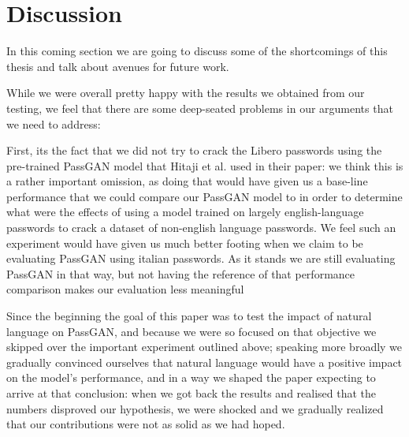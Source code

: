 \section{Discussion}

In this coming section we are going to discuss some of the shortcomings of this thesis and talk about avenues for future work.

While we were overall pretty happy with the results we obtained from our testing, we feel that there are some deep-seated problems in our arguments that we need to address:

First, its the fact that we did not try to crack the Libero passwords using the pre-trained PassGAN model that Hitaji et al. \cite{PassGAN} used in their paper: we think this is a rather important omission, 
as doing that would have given us a base-line performance that we could compare our PassGAN model to in order to determine what were the effects of using a model trained on largely english-language passwords to crack a dataset of non-english language passwords. We feel such an experiment would have given us much better footing when we claim to be evaluating PassGAN using italian passwords. As it stands we are 
still evaluating PassGAN in that way, but not having the reference of that performance comparison makes our evaluation less meaningful

Since the beginning the goal of this paper was to test the impact of natural language on PassGAN, and because we were so focused on that objective we skipped over the important experiment outlined above; 
speaking more broadly we gradually convinced ourselves that natural language would have a positive impact on the model's performance, and in a way we shaped the paper expecting to arrive at that conclusion: 
when we got back the results and realised that the numbers disproved our hypothesis, we were shocked and we gradually realized that our contributions were not as solid as we had hoped.

